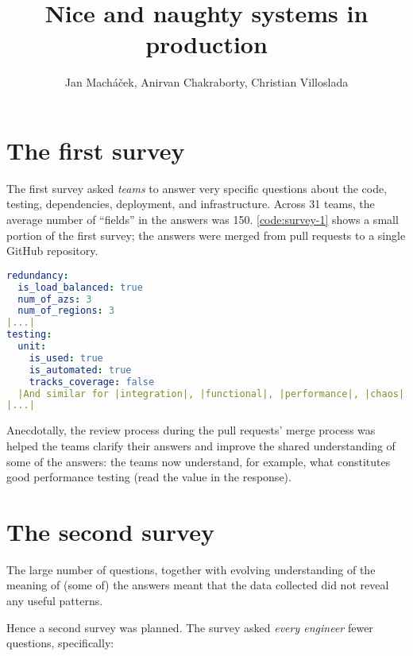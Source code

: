 \documentclass[10 pt, twocolumn]{article}
\title{Nice and naughty systems in production}
\author{Jan Macháček, Anirvan Chakraborty, Christian Villoslada}
\begin{document}

\section{The first survey}
The first survey asked \emph{teams} to answer very specific questions about the code, testing, dependencies, deployment, and infrastructure. Across 31 teams, the average number of ``fields'' in the answers was 150. \autoref{code:survey-1} shows a small portion of the first survey; the answers were merged from pull requests to a single GitHub repository. 

\begin{lstlisting}[caption={Survey example}, label={code:survey-1}, language=yaml, escapechar=|]
redundancy:
  is_load_balanced: true
  num_of_azs: 3
  num_of_regions: 3
|...|
testing:
  unit:
    is_used: true 
    is_automated: true
    tracks_coverage: false
  |And similar for |integration|, |functional|, |performance|, |chaos|.|
|...|
\end{lstlisting}

Anecdotally, the review process during the pull requests' merge process was helped the teams clarify their answers and improve the shared understanding of some of the answers: the teams now understand, for example, what constitutes good performance testing (read the value  in the response). 


\section{The second survey}
The large number of questions, together with evolving understanding of the meaning of (some of) the answers meant that the data collected did not reveal any useful patterns. 

Hence a second survey was planned. The survey asked \emph{every engineer} fewer questions, specifically:
\end{document}
